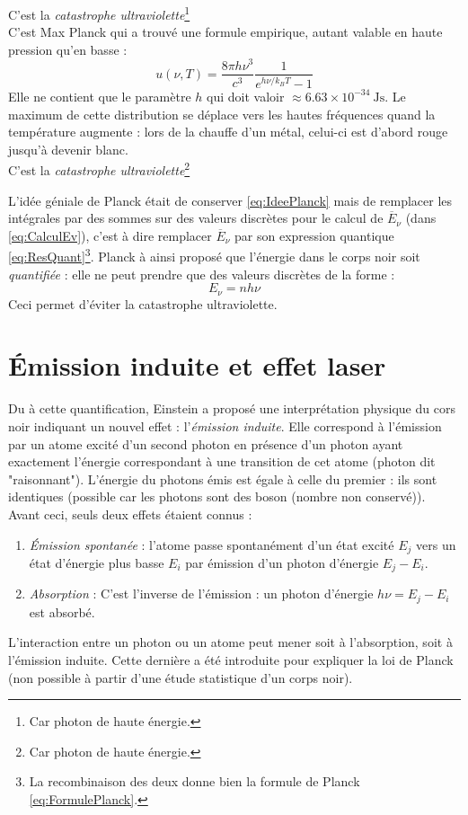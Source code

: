 \documentclass	[11pt, a4paper, openany]{book}
\begin{document}
		C'est la \textit{catastrophe ultraviolette}\footnote{Car photon de haute énergie.}\\
		C'est Max Planck qui a trouvé une formule empirique, autant valable en haute pression qu'en basse :
		\begin{equation}
			u(\nu,T) = \dfrac{8\pi h\nu^3}{c^3}\dfrac{1}{e^{h\nu/k_BT}-1}
			\label{eq:FormulePlanck}
		\end{equation}
		Elle ne contient que le paramètre $h$ qui doit valoir $\approx 6.63\times 10^{-34}\ \text{Js}$. Le maximum 
		de cette distribution se déplace vers les hautes fréquences quand la température augmente : lors de la 
		chauffe d'un métal, celui-ci est d'abord rouge jusqu'à devenir blanc.\\
		C'est la \textit{catastrophe ultraviolette}\footnote{Car photon de haute énergie.}
		
		L'idée géniale de Planck était de conserver \autoref{eq:IdeePlanck} mais de remplacer les intégrales par
		des sommes sur des valeurs discrètes pour le calcul de $\overline{E}_\nu$ (dans \autoref{eq:CalculEv}), 
		c'est à dire remplacer $\overline{E}_\nu$ par son expression quantique \autoref{eq:ResQuant}\footnote{La 
			recombinaison des deux donne bien la formule de Planck \autoref{eq:FormulePlanck}.}. Planck à ainsi proposé 
		que l'énergie dans le corps noir soit \textit{quantifiée} : elle ne peut prendre que des valeurs discrètes 
		de la forme :
		\begin{equation}
			E_\nu = nh\nu
		\end{equation}
		Ceci permet d'éviter la catastrophe ultraviolette.
		
		
		\section{Émission induite et effet laser}
		Du à cette quantification, Einstein a proposé une interprétation physique du cors noir indiquant un nouvel 
		effet : l'\textit{émission induite}. Elle correspond à l'émission par un atome excité d'un second photon en 
		présence d'un photon ayant exactement l'énergie correspondant à une transition de cet atome (photon dit 
		"raisonnant"). L'énergie du photons émis est égale à celle du premier : ils sont identiques (possible car les
		photons sont des boson (nombre non conservé)). Avant ceci, seuls deux effets étaient connus :
		\begin{enumerate}
			\item \textit{Émission spontanée} : l'atome passe spontanément d'un état excité $E_j$ vers un état d'énergie
			      plus basse $E_i$ par émission d'un photon d'énergie $E_j-E_i$.
			\item \textit{Absorption} : C'est l'inverse de l'émission : un photon d'énergie $h\nu = E_j-E_i$ est 
			      absorbé.
		\end{enumerate}
		L'interaction entre un photon ou un atome peut mener soit à l'absorption, soit à l'émission induite. Cette 
		dernière a été introduite pour expliquer la loi de Planck (non possible à partir d'une étude statistique d'un
		corps noir).
		
\end{document}
